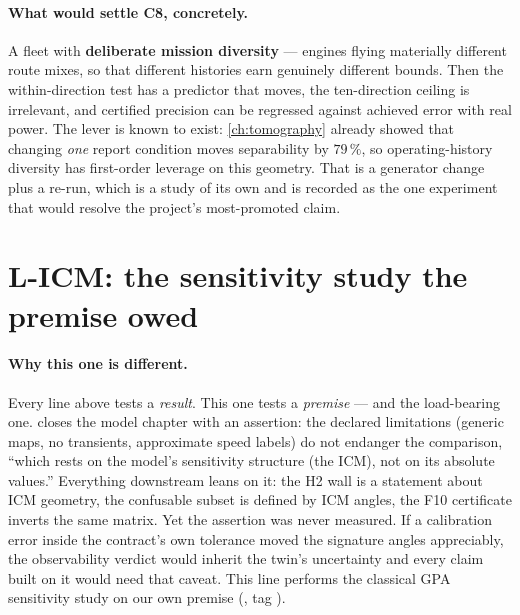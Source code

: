 \paragraph{What would settle C8, concretely.} A fleet with \textbf{deliberate mission
diversity} --- engines flying materially different route mixes, so that different histories earn
genuinely different bounds. Then the within-direction test has a predictor that moves, the
ten-direction ceiling is irrelevant, and certified precision can be regressed against achieved
error with real power. The lever is known to exist: \cref{ch:tomography} already showed that
changing \emph{one} report condition moves separability by $79\,\%$, so operating-history
diversity has first-order leverage on this geometry. That is a generator change plus a re-run,
which is a study of its own and is recorded as the one experiment that would resolve the
project's most-promoted claim.


\section{L-ICM: the sensitivity study the premise owed}
\label{sec:f-icm}

\paragraph{Why this one is different.} Every line above tests a \emph{result}. This one tests
a \emph{premise} --- and the load-bearing one.  closes the model chapter
with an assertion: the declared limitations (generic maps, no transients, approximate speed
labels) do not endanger the comparison, ``which rests on the model's sensitivity structure
(the ICM), not on its absolute values.'' Everything downstream leans on it: the H2 wall is a
statement about ICM geometry, the confusable subset is defined by ICM angles, the F10
certificate inverts the same matrix. Yet the assertion was never measured. If a calibration
error inside the contract's own tolerance moved the signature angles appreciably, the
observability verdict would inherit the twin's uncertainty and every claim built on it would
need that caveat. This line performs the classical GPA sensitivity study on our own premise
(, tag ).


